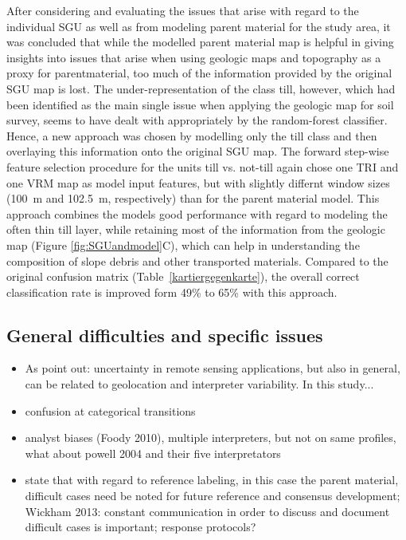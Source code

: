 \documentclass[preprint,12pt,authoryear]{elsarticle}
\begin{document}
After considering and evaluating the issues that arise with regard to the individual SGU as well as from modeling parent material for the study area, it was concluded that while the modelled parent material map is helpful in giving insights into issues that arise when using geologic maps and topography as a proxy for parentmaterial, too much of the information provided by the original SGU map is lost. The under-representation of the class till, however, which had been identified as the main single issue when applying the geologic map for soil survey, seems to have dealt with appropriately by the random-forest classifier. Hence, a new approach was chosen by modelling only the till class and then overlaying this information onto the original SGU map. The forward step-wise feature selection procedure for the units till vs. not-till again chose one TRI and one VRM map as model input features, but with slightly differnt window sizes (100~m and 102.5~m, respectively) than for the parent material model. This approach combines the models good performance with regard to modeling the often thin till layer, while retaining most of the information from the geologic map (Figure \ref{fig:SGUandmodel}C), which can help in understanding the composition of slope debris and other transported materials. Compared to the original confusion matrix (Table~\ref{kartiergegenkarte}), the overall correct classification rate is improved form 49\% to 65\% with this approach.

\subsection{General difficulties and specific issues} 
\begin{itemize}
\item	As \cite{Olofsson2013} point out: uncertainty in remote sensing applications, but also in general, can be related to geolocation and interpreter  variability. In this study...
\item confusion at categorical transitions \citep{Olofsson2013}
\item analyst biases (Foody 2010), multiple interpreters, but not on same profiles, what about powell 2004 and their five interpretators   
\item \cite{Olofsson2013} state that with regard to reference labeling, in this case the parent material, difficult cases need be noted for future reference and consensus development; Wickham 2013: constant communication in order to discuss and document difficult cases is important; response protocols?
\end{itemize}
\end{document}
